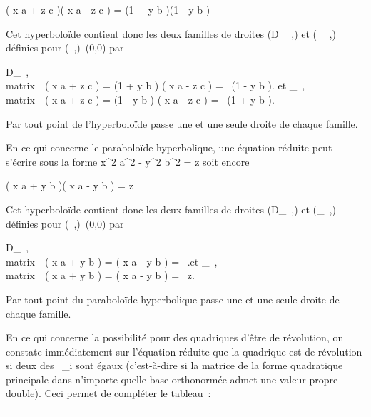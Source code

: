 \documentclass[]{article}
\begin{document}
\left ( x \over a + z
\over c \right )\left (
x \over a - z \over c
\right ) = \left (1 + y
\over b \right )\left (1
- y \over b \right )

Cet hyperboloïde contient donc les deux familles de droites
(D\_\lambda~,\mu) et (\Delta\_\lambda~,\mu) définies pour
(\lambda~,\mu)\neq~(0,0) par

D\_\lambda~,\mu \left
\\matrix\,\lambda~\left
( x \over a + z \over c
\right ) = \mu\left (1 + y
\over b \right ) \cr
\cr \mu\left ( x \over a
- z \over c \right ) =
\lambda~\left (1 - y \over b
\right )\right .\quad
\text et \quad \Delta\_\lambda~,\mu
\left
\\matrix\,\lambda~\left
( x \over a + z \over c
\right ) = \mu\left (1 - y
\over b \right ) \cr
\cr \mu\left ( x \over a
- z \over c \right ) =
\lambda~\left (1 + y \over b
\right )\right .

Par tout point de l'hyperboloïde passe une et une seule droite de chaque
famille.

En ce qui concerne le paraboloïde hyperbolique, une équation réduite
peut s'écrire sous la forme  x^2 \over
a^2 - y^2 \over
b^2 = z soit encore

\left ( x \over a + y
\over b \right )\left (
x \over a - y \over b
\right ) = z

Cet hyperboloïde contient donc les deux familles de droites
(D\_\lambda~,\mu) et (\Delta\_\lambda~,\mu) définies pour
(\lambda~,\mu)\neq~(0,0) par

D\_\lambda~,\mu \left
\\matrix\,\lambda~\left
( x \over a + y \over b
\right ) = \muz \cr \cr
\mu\left ( x \over a - y
\over b \right ) =
\lambda~\right .\quad \text et
\quad \Delta\_\lambda~,\mu \left
\\matrix\,\lambda~\left
( x \over a + y \over b
\right ) = \mu \cr \cr
\mu\left ( x \over a - y
\over b \right ) =
\lambda~z\right .

Par tout point du paraboloïde hyperbolique passe une et une seule droite
de chaque famille.

En ce qui concerne la possibilité pour des quadriques d'être de
révolution, on constate immédiatement sur l'équation réduite que la
quadrique est de révolution si deux des \lambda~\_i sont égaux
(c'est-à-dire si la matrice de la forme quadratique principale \Phi dans
n'importe quelle base orthonormée admet une valeur propre double). Ceci
permet de compléter le tableau~:

\begin{center}\rule{3in}{0.4pt}\end{center}
\end{document}

